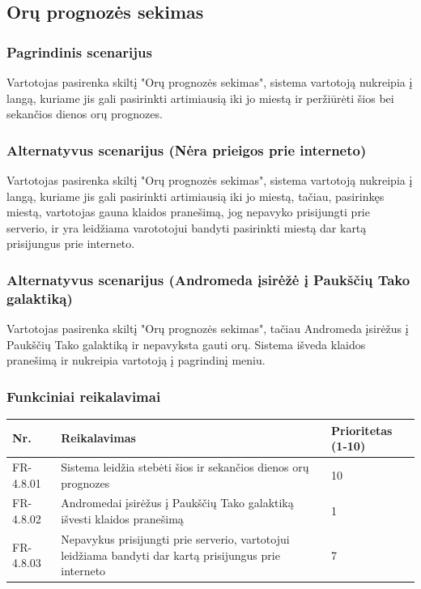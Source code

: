 \documentclass[oneside]{VUMIFPSkursinis}
\begin{document}
\subsection{Orų prognozės sekimas}
\subsubsection{Pagrindinis scenarijus}
	Vartotojas pasirenka skiltį "Orų prognozės sekimas", sistema vartotoją nukreipia į langą, kuriame jis gali pasirinkti artimiausią iki jo miestą ir peržiūrėti šios bei sekančios dienos orų prognozes.
\subsubsection{Alternatyvus scenarijus (Nėra prieigos prie interneto)}
	Vartotojas pasirenka skiltį "Orų prognozės sekimas", sistema vartotoją nukreipia į langą, kuriame jis gali pasirinkti artimiausią iki jo miestą, tačiau, pasirinkęs miestą, vartotojas gauna klaidos pranešimą, jog nepavyko prisijungti prie serverio, ir yra leidžiama varototojui bandyti pasirinkti miestą dar kartą prisijungus prie interneto.
\subsubsection{Alternatyvus scenarijus (Andromeda įsirėžė į Paukščių Tako galaktiką)}
	Vartotojas pasirenka skiltį "Orų prognozės sekimas", tačiau Andromeda įsirėžus į Paukščių Tako galaktiką ir nepavyksta gauti orų. Sistema išveda klaidos pranešimą ir nukreipia vartotoją į pagrindinį meniu.
\subsubsection{Funkciniai reikalavimai}
\begin{table}[htbp]
	\begin{tabularx}{1\textwidth}{ |P{2.5cm}|X|P{3cm }| }  \hline
      Nr. & Reikalavimas & Prioritetas (1-10)  \\   \hline 
      FR-4.8.01 & Sistema leidžia stebėti šios ir sekančios dienos orų prognozes & 10  \\   \hline
			FR-4.8.02 & Andromedai įsirėžus į Paukščių Tako galaktiką išvesti klaidos pranešimą & 1 \\  \hline
			FR-4.8.03 & Nepavykus prisijungti prie serverio, vartotojui leidžiama bandyti dar kartą prisijungus prie interneto & 7 \\ \hline
	\end{tabularx}
\end{table}
\end{document}
